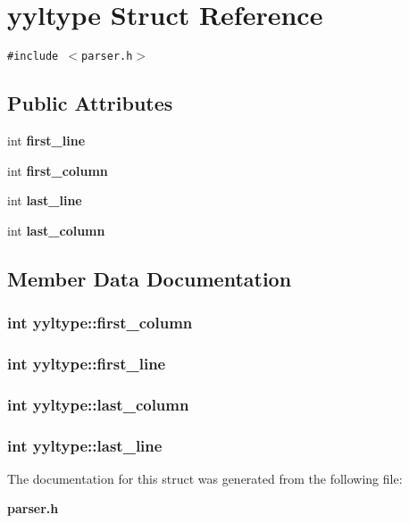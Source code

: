 \section{yyltype  Struct Reference}
\label{structyyltype}
{\tt \#include $<$parser.h$>$}

\subsection*{Public Attributes}
\begin{CompactItemize}
\item 
int {\bf first\_\-line}
\item 
int {\bf first\_\-column}
\item 
int {\bf last\_\-line}
\item 
int {\bf last\_\-column}
\end{CompactItemize}


\subsection{Member Data Documentation}
\subsubsection{\setlength{\rightskip}{0pt plus 5cm}int yyltype::first\_\-column}\label{structyyltype_m1}


\subsubsection{\setlength{\rightskip}{0pt plus 5cm}int yyltype::first\_\-line}\label{structyyltype_m0}


\subsubsection{\setlength{\rightskip}{0pt plus 5cm}int yyltype::last\_\-column}\label{structyyltype_m3}


\subsubsection{\setlength{\rightskip}{0pt plus 5cm}int yyltype::last\_\-line}\label{structyyltype_m2}




The documentation for this struct was generated from the following file:\begin{CompactItemize}
\item 
{\bf parser.h}\end{CompactItemize}
